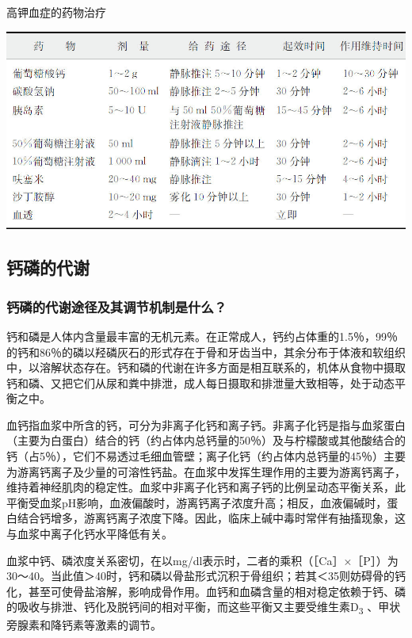 \begin{table}[htbp]
\centering
\caption{高钾血症的药物治疗}
\label{tab19-2}
\includegraphics{./images/Image00162.jpg}
\end{table}

\subsection{钙磷的代谢}

\subsubsection{钙磷的代谢途径及其调节机制是什么？}

钙和磷是人体内含量最丰富的无机元素。在正常成人，钙约占体重的1.5％，99％的钙和86％的磷以羟磷灰石的形式存在于骨和牙齿当中，其余分布于体液和软组织中，以溶解状态存在。钙和磷的代谢在许多方面是相互联系的，机体从食物中摄取钙和磷、又把它们从尿和粪中排泄，成人每日摄取和排泄量大致相等，处于动态平衡之中。

血钙指血浆中所含的钙，可分为非离子化钙和离子钙。非离子化钙是指与血浆蛋白（主要为白蛋白）结合的钙（约占体内总钙量的50％）及与柠檬酸或其他酸结合的钙（占5％），它们不易透过毛细血管壁；离子化钙（约占体内总钙量的45％）主要为游离钙离子及少量的可溶性钙盐。在血浆中发挥生理作用的主要为游离钙离子，维持着神经肌肉的稳定性。血浆中非离子化钙和离子钙的比例呈动态平衡关系，此平衡受血浆pH影响，血液偏酸时，游离钙离子浓度升高；相反，血液偏碱时，蛋白结合钙增多，游离钙离子浓度下降。因此，临床上碱中毒时常伴有抽搐现象，这与血浆中离子化钙水平降低有关。

血浆中钙、磷浓度关系密切，在以mg/dl表示时，二者的乘积（［Ca］×［P］）为30～40。当此值＞40时，钙和磷以骨盐形式沉积于骨组织；若其＜35则妨碍骨的钙化，甚至可使骨盐溶解，影响成骨作用。血钙和血磷含量的相对稳定依赖于钙、磷的吸收与排泄、钙化及脱钙间的相对平衡，而这些平衡又主要受维生素D\textsubscript{3}
、甲状旁腺素和降钙素等激素的调节。

